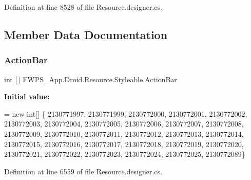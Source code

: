 Definition at line 8528 of file Resource.\+designer.\+cs.



\subsection{Member Data Documentation}
\mbox{\label{class_f_w_p_s___app_1_1_droid_1_1_resource_1_1_styleable_a7381bf299215d299521e9664e15dad7d}} 
\subsubsection{\texorpdfstring{Action\+Bar}{ActionBar}}
{\footnotesize\ttfamily int \mbox{[}$\,$\mbox{]} F\+W\+P\+S\+\_\+\+App.\+Droid.\+Resource.\+Styleable.\+Action\+Bar\hspace{0.3cm}{\ttfamily [static]}}

{\bfseries Initial value\+:}
\begin{DoxyCode}
= \textcolor{keyword}{new} \textcolor{keywordtype}{int}[] \{
                    2130771997,
                    2130771999,
                    2130772000,
                    2130772001,
                    2130772002,
                    2130772003,
                    2130772004,
                    2130772005,
                    2130772006,
                    2130772007,
                    2130772008,
                    2130772009,
                    2130772010,
                    2130772011,
                    2130772012,
                    2130772013,
                    2130772014,
                    2130772015,
                    2130772016,
                    2130772017,
                    2130772018,
                    2130772019,
                    2130772020,
                    2130772021,
                    2130772022,
                    2130772023,
                    2130772024,
                    2130772025,
                    2130772089\}
\end{DoxyCode}


Definition at line 6559 of file Resource.\+designer.\+cs.

\mbox{\label{class_f_w_p_s___app_1_1_droid_1_1_resource_1_1_styleable_a39e1164adf59598deef27c9278821d26}} 
